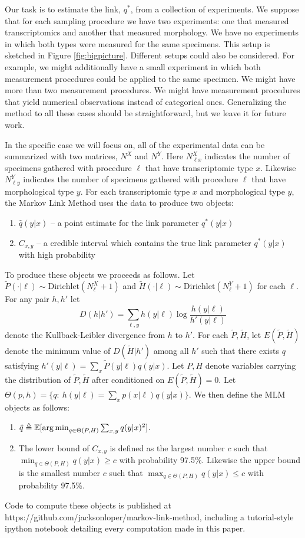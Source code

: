 Our task is to estimate the link, $q^*$, from a collection of experiments.  We suppose that for each sampling procedure we have two experiments: one that measured transcriptomics and another that measured morphology.  We have no experiments in which both types were measured for the same specimens.  This setup is sketched in Figure \ref{fig:bigpicture}.  Different setups could also be considered.   For example, we might additionally have a small experiment in which both measurement procedures could be applied to the same specimen.  We might have more than two measurement procedures.  We might have measurement procedures that yield numerical observations instead of categorical ones.  Generalizing the method to all these cases should be straightforward, but we leave it for future work.  

In the specific case we will focus on, all of the experimental data can be summarized with two matrices, $N^X$ and $N^Y$.  Here $N^X_{\ell x}$ indicates the number of specimens gathered with procedure $\ell$ that have transcriptomic type $x$.  Likewise $N^Y_{\ell y}$ indicates the number of specimens gathered with procedure $\ell$ that have morphological type $y$.  For each transcriptomic type $x$ and morphological type $y$, the Markov Link Method uses the data to produce two objects:
%
\begin{enumerate}
    \item $\hat q(y|x)$ -- a point estimate for the link parameter $q^*(y|x)$
    \item $C_{x,y}$ -- a credible interval which contains the true link parameter $q^*(y|x)$ with high probability
\end{enumerate}
%
To produce these objects we proceeds as follows.  Let $\tilde P(\cdot |\ell) \sim \mathrm{Dirichlet}(N^X_\ell+1)$ and $\tilde H(\cdot |\ell) \sim \mathrm{Dirichlet}(N^Y_\ell+1)$ for each $\ell$.  For any pair $h,h'$ let 
\[
D(h|h') = \sum_{\ell,y} h(y|\ell) \log \frac{h(y|\ell)}{h'(y|\ell)}
\]
denote the Kullback-Leibler divergence from $h$ to $h'$.  For each $\tilde P,\tilde H$, let $E(\tilde P,\tilde H)$ denote the minimum value of $D(\tilde H|h')$ among all $h'$ such that there exists $q$ satisfying $h'(y|\ell)=\sum_x \tilde P(y|\ell)q(y|x)$.  Let $P,H$ denote variables carrying the distribution of $\tilde P,\tilde H$ after conditioned on $E(\tilde P,\tilde H)=0$.   Let $\Theta(p,h)=\{q:\ h(y|\ell) = \sum_x p(x|\ell)q(y|x)\}$.  We then define the MLM objects as follows:
\begin{enumerate}
    \item $\hat q\triangleq\mathbb{E}[\operatorname*{arg\,min}_{q\in \Theta(P,H)} \sum_{x,y} q(y|x)^2]$.
    \item The lower bound of $C_{x,y}$ is defined as the largest number $c$ such that $\min_{q\in \Theta(P,H)} q(y|x) \geq c$ with probability 97.5\%.  Likewise the upper bound is the smallest number $c$ such that $\max_{q\in \Theta(P,H)} q(y|x) \leq c$ with probability 97.5\%.
\end{enumerate} 
%
Code to compute these objects is published at https://github.com/jacksonloper/markov-link-method, including a tutorial-style ipython notebook detailing every computation made in this paper.

